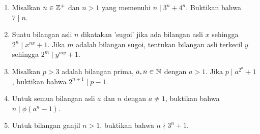 \documentclass[11pt]{scrartcl}
\begin{document}
\begin{enumerate}
    \item Misalkan $n \in \mathbb Z^+$ dan $n > 1$ yang memenuhi $n \mid 3^n + 4^n$. Buktikan bahwa $7 \mid n$.
    
    \item Suatu bilangan asli $n$ dikatakan 'sugoi' jika ada bilangan asli $x$ sehingga $2^n \mid x^{nx}+1$. Jika $m$ adalah bilangan sugoi, tentukan bilangan asli terkecil $y$ sehingga $2^m \mid y^{my}+1$.
    
    
    \item Misalkan $p>3$ adalah bilangan prima, $a,n \in \mathbb N$ dengan $a > 1$. Jika $p \mid a^{2^n}+1$, buktikan bahwa $2^{n+1} \mid p-1$.
    
    \item Untuk semua bilangan asli $a$ dan $n$ dengan $a \neq 1$, buktikan bahwa $n \mid \phi(a^n-1)$.
    
    \item Untuk bilangan ganjil $n > 1$, buktikan bahwa $n \nmid 3^n+1$.
\end{enumerate}
\end{document}
